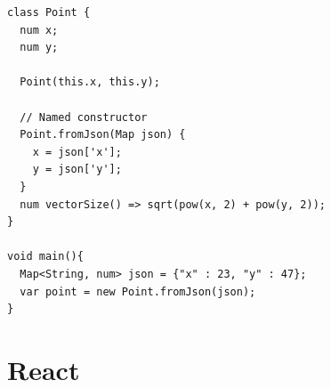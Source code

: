 \begin{frame}[fragile]
	\begin{verbatim}
class Point {
  num x;
  num y;

  Point(this.x, this.y);

  // Named constructor
  Point.fromJson(Map json) {
    x = json['x'];
    y = json['y'];
  }
  num vectorSize() => sqrt(pow(x, 2) + pow(y, 2));  
}

void main(){
  Map<String, num> json = {"x" : 23, "y" : 47};
  var point = new Point.fromJson(json);
}
	\end{verbatim}
\end{frame}

\section{React}
